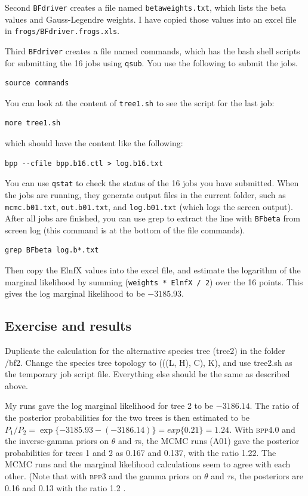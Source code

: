 \documentclass[a4paper]{book}
\numberwithin{equation}{section} \renewcommand{\baselinestretch}{0.55}
\begin{document}
Second \texttt{BFdriver} creates a file named
\texttt{betaweights.txt}, which lists the beta values and
Gauss-Legendre weights.  I have copied those values into an excel file
in \texttt{frogs/BFdriver.frogs.xls}.

Third \texttt{BFdriver} creates a file named commands, which has the
bash shell scripts for submitting the 16 jobs using \texttt{qsub}.
You use the following to submit the jobs.
\begin{verbatim}
source commands
\end{verbatim}

You can look at the content of \texttt{tree1.sh} to see the script for
the last job:
\begin{verbatim}
more tree1.sh
\end{verbatim}
which should have the content like the following:
\begin{verbatim}
bpp --cfile bpp.b16.ctl > log.b16.txt
\end{verbatim}

You can use \texttt{qstat} to check the status of the 16 jobs you have
submitted.  When the jobs are running, they generate output files in
the current folder, such as \texttt{mcmc.b01.txt},
\texttt{out.b01.txt}, and \texttt{log.b01.txt} (which logs the screen
output).  After all jobs are finished, you can use grep to extract the
line with \texttt{BFbeta} from screen log (this command is at the
bottom of the file commands).
\begin{verbatim}
grep BFbeta log.b*.txt
\end{verbatim}
Then copy the ElnfX values into the excel file, and estimate the
logarithm of the marginal likelihood by summing (\texttt{weights *
  ElnfX / 2}) over the 16 points. This gives the log marginal
likelihood to be $-3185.93$.

\subsection{Exercise and results}

Duplicate the calculation for the alternative species tree (tree2) in
the folder /bf2.  Change the species tree topology to (((L, H), C),
K), and use tree2.sh as the temporary job script file.  Everything
else should be the same as described above.

My runs gave the log marginal likelihood for tree 2 to be $-3186.14$.
The ratio of the posterior probabilities for the two trees is then
estimated to be
$P_1/P_2 = \exp\{-3185.93 - (-3186.14)\} = exp\{0.21\} = 1.24$.  With
\textsc{bpp}4.0 and the inverse-gamma priors on $\theta$ and $\tau$s,
the MCMC runs (A01) gave the posterior probabilities for trees 1 and 2
as 0.167 and 0.137, with the ratio 1.22.  The MCMC runs and the
marginal likelihood calculations seem to agree with each other.  (Note
that with \textsc{bpp3} and the gamma priors on $\theta$ and $\tau$s,
the posteriors are 0.16 and 0.13 with the ratio 1.2
\citep[][fig.~4]{Yang2015}.
\end{document}
